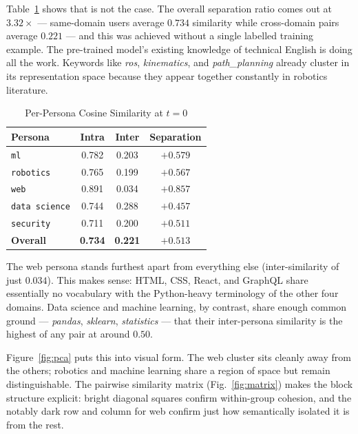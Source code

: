 \documentclass[conference]{IEEEtran}
\begin{document}
Table~\ref{tab:sim} shows that is not the case. The overall
separation ratio comes out at $3.32\times$ --- same-domain
users average $0.734$ similarity while cross-domain pairs
average $0.221$ --- and this was achieved without a single
labelled training example. The pre-trained model's existing
knowledge of technical English is doing all the work.
Keywords like \textit{ros}, \textit{kinematics}, and
\textit{path\_planning} already cluster in its representation
space because they appear together constantly in robotics
literature.

\begin{table}[t]
  \caption{Per-Persona Cosine Similarity at $t = 0$}
  \label{tab:sim}
  \centering
  \renewcommand{\arraystretch}{1.3}
  \begin{tabular}{lccc}
    \toprule
    \textbf{Persona}      & \textbf{Intra} & \textbf{Inter}
                          & \textbf{Separation} \\
    \midrule
    \texttt{ml}           & 0.782 & 0.203 & $+0.579$ \\
    \texttt{robotics}     & 0.765 & 0.199 & $+0.567$ \\
    \texttt{web}          & 0.891 & 0.034 & $+0.857$ \\
    \texttt{data science} & 0.744 & 0.288 & $+0.457$ \\
    \texttt{security}     & 0.711 & 0.200 & $+0.511$ \\
    \midrule
    \textbf{Overall}      & \textbf{0.734} & \textbf{0.221}
                          & $\mathbf{+0.513}$ \\
    \bottomrule
  \end{tabular}
\end{table}

The web persona stands furthest apart from everything else
(inter-similarity of just $0.034$). This makes sense: HTML,
CSS, React, and GraphQL share essentially no vocabulary with
the Python-heavy terminology of the other four domains. Data
science and machine learning, by contrast, share enough
common ground --- \textit{pandas}, \textit{sklearn},
\textit{statistics} --- that their inter-persona similarity
is the highest of any pair at around $0.50$.

Figure~\ref{fig:pca} puts this into visual form. The web
cluster sits cleanly away from the others; robotics and
machine learning share a region of space but remain
distinguishable. The pairwise similarity matrix
(Fig.~\ref{fig:matrix}) makes the block structure explicit:
bright diagonal squares confirm within-group cohesion, and
the notably dark row and column for web confirm just how
semantically isolated it is from the rest.
\end{document}
